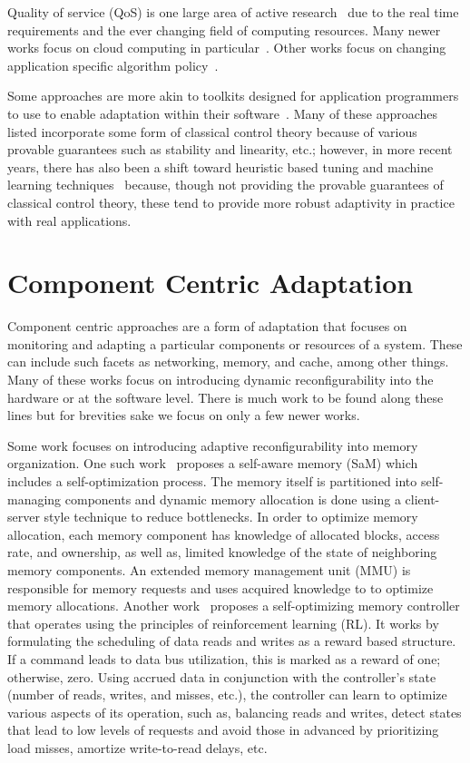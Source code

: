     Quality of service (QoS) is one large area of active research~\cite{AbdelzaherShin1998, CardelliniEtAl2012, IvanovicEtAl2010, LuEtAl2006, ZhengEtAl2010} due to the real time requirements and the ever changing field of computing resources. Many newer works focus on cloud computing in particular~\cite{KumarEtAl2013, WangEtAl2013}. Other works focus on changing application specific algorithm policy~\cite{ThomasEtAl2005}.
    
    Some approaches are more akin to toolkits designed for application programmers to use to enable adaptation within their software~\cite{GoelEtAl1998, GoelEtAl1999}. Many of these approaches listed incorporate some form of classical control theory because of various provable guarantees such as stability and linearity, etc.; however, in more recent years, there has also been a shift toward heuristic based tuning and machine learning techniques~\cite{MaggioEtAl2011} because, though not providing the provable guarantees of classical control theory, these tend to provide more robust adaptivity in practice with real applications.
\section{Component Centric Adaptation}
    Component centric approaches are a form of adaptation that focuses on monitoring and adapting a particular components or resources of a system. These can include such facets as networking, memory, and cache, among other things. Many of these works focus on introducing dynamic reconfigurability into the hardware or at the software level. There is much work to be found along these lines but for brevities sake we focus on only a few newer works.
    
    Some work focuses on introducing adaptive reconfigurability into memory organization. One such work~\cite{SaM_2013} proposes a self-aware memory (SaM) which includes a self-optimization process. The memory itself is partitioned into self-managing components and dynamic memory allocation is done using a client-server style technique to reduce bottlenecks. In order to optimize memory allocation, each memory component has knowledge of allocated blocks, access rate, and ownership, as well as, limited knowledge of the state of neighboring memory components. An extended memory management unit (MMU) is responsible for memory requests and uses acquired knowledge to to optimize memory allocations. Another work~\cite{IpekEtAl2008} proposes a self-optimizing memory controller that operates using the principles of reinforcement learning (RL). It works by formulating the scheduling of data reads and writes as a reward based structure. If a command leads to data bus utilization, this is marked as a reward of one; otherwise, zero. Using accrued data in conjunction with the controller's state (number of reads, writes, and misses, etc.), the controller can learn to optimize various aspects of its operation, such as, balancing reads and writes, detect states that lead to low levels of requests and avoid those in advanced by prioritizing load misses, amortize write-to-read delays, etc.
    
